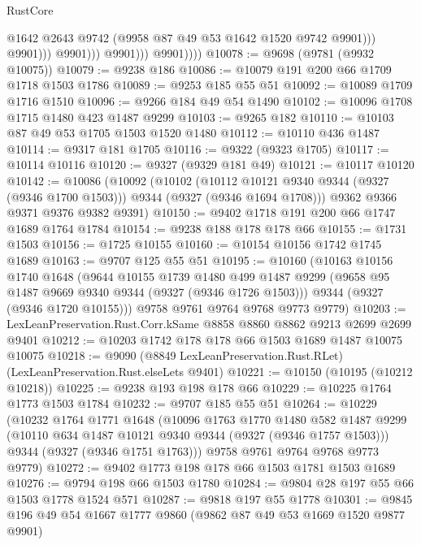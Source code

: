\begin{lexlean}{RustCore}
\begin{coremodule}
                                  @1642
                                  @2643
                                  @9742
                                  (@9958 @87 @49 @53 @1642 @1520 @9742 @9901)))
                              @9901)))
                        @9901)))
                  @9901)))
            @9901))))
@10078 := @9698 (@9781 (@9932 @10075))
@10079 := @9238 @186
@10086 := @10079 @191 @200 @66 @1709 @1718 @1503 @1786
@10089 := @9253 @185 @55 @51
@10092 := @10089 @1709 @1716 @1510
@10096 := @9266 @184 @49 @54 @1490
@10102 := @10096 @1708 @1715 @1480 @423 @1487 @9299
@10103 := @9265 @182
@10110 := @10103 @87 @49 @53 @1705 @1503 @1520 @1480
@10112 := @10110 @436 @1487
@10114 := @9317 @181 @1705
@10116 := @9322 (@9323 @1705)
@10117 := @10114 @10116
@10120 := @9327 (@9329 @181 @49)
@10121 := @10117 @10120
@10142 := @10086
    (@10092
      (@10102
        (@10112 @10121 @9340 @9344 (@9327 (@9346 @1700 @1503)))
        @9344
        (@9327 (@9346 @1694 @1708)))
      @9362
      @9366
      @9371
      @9376
      @9382
      @9391)
@10150 := @9402 @1718 @191 @200 @66 @1747 @1689 @1764 @1784
@10154 := @9238 @188 @178 @178 @66
@10155 := @1731 @1503
@10156 := @1725 @10155
@10160 := @10154 @10156 @1742 @1745 @1689
@10163 := @9707 @125 @55 @51
@10195 := @10160
    (@10163
      @10156
      @1740
      @1648
      (@9644
        @10155
        @1739
        @1480
        @499
        @1487
        @9299
        (@9658 @95 @1487 @9669 @9340 @9344 (@9327 (@9346 @1726 @1503)))
        @9344
        (@9327 (@9346 @1720 @10155)))
      @9758
      @9761
      @9764
      @9768
      @9773
      @9779)
@10203 := LexLeanPreservation.Rust.Corr.kSame @8858 @8860 @8862 @9213 @2699 @2699 @9401
@10212 := @10203 @1742 @178 @178 @66 @1503 @1689 @1487 @10075 @10075
@10218 := @9090 (@8849 LexLeanPreservation.Rust.RLet) (LexLeanPreservation.Rust.elseLets @9401)
@10221 := @10150 (@10195 (@10212 @10218))
@10225 := @9238 @193 @198 @178 @66
@10229 := @10225 @1764 @1773 @1503 @1784
@10232 := @9707 @185 @55 @51
@10264 := @10229
    (@10232
      @1764
      @1771
      @1648
      (@10096
        @1763
        @1770
        @1480
        @582
        @1487
        @9299
        (@10110 @634 @1487 @10121 @9340 @9344 (@9327 (@9346 @1757 @1503)))
        @9344
        (@9327 (@9346 @1751 @1763)))
      @9758
      @9761
      @9764
      @9768
      @9773
      @9779)
@10272 := @9402 @1773 @198 @178 @66 @1503 @1781 @1503 @1689
@10276 := @9794 @198 @66 @1503 @1780
@10284 := @9804 @28 @197 @55 @66 @1503 @1778 @1524 @571
@10287 := @9818 @197 @55 @1778
@10301 := @9845 @196 @49 @54 @1667 @1777 @9860 (@9862 @87 @49 @53 @1669 @1520 @9877 @9901)

\end{coremodule}
\end{lexlean}
